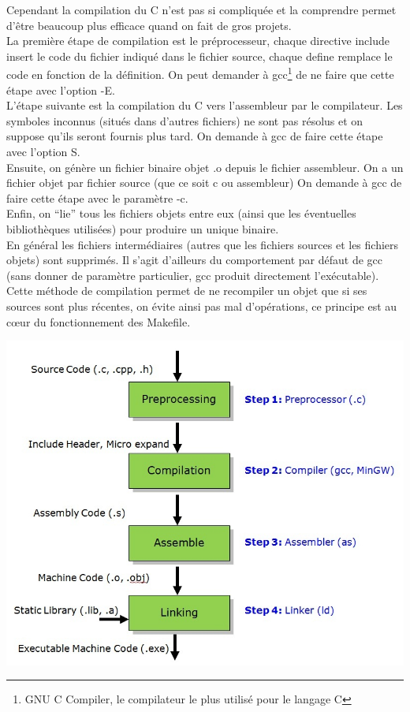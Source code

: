 \documentclass[a4paper,10pt]{article} %
\begin{document}
Cependant la compilation du C n'est pas si compliquée et la comprendre permet d'être beaucoup plus efficace quand on fait de gros projets.\\

La première étape de compilation est le préprocesseur, chaque directive include insert le code du fichier indiqué dans le fichier source, chaque define remplace le code en fonction de la définition. On peut demander à gcc\footnote{GNU C Compiler, le compilateur le plus utilisé pour le langage C} de ne faire que cette étape avec l'option -E.\\

L'étape suivante est la compilation du C vers l'assembleur par le compilateur. Les symboles inconnus (situés dans d'autres fichiers) ne sont pas résolus et on suppose qu'ils seront fournis plus tard. On demande à gcc de faire cette étape avec l'option S.\\

Ensuite, on génère un fichier binaire objet .o depuis le fichier assembleur. On a un fichier objet par fichier source (que ce soit c ou assembleur) On demande à gcc de faire cette étape avec le paramètre -c.\\

Enfin, on ``lie'' tous les fichiers objets entre eux (ainsi que les éventuelles bibliothèques utilisées) pour produire un unique binaire.\\

En général les fichiers intermédiaires (autres que les fichiers sources et les fichiers objets) sont supprimés. Il s'agit d'ailleurs du comportement par défaut de gcc (sans donner de paramètre particulier, gcc produit directement l’exécutable).\\

Cette méthode de compilation permet de ne recompiler un objet que si ses sources sont plus récentes, on évite ainsi pas mal d'opérations, ce principe est au cœur du fonctionnement des Makefile.

\includegraphics[scale=0.7]{assets/compilation.jpg}
\end{document}
